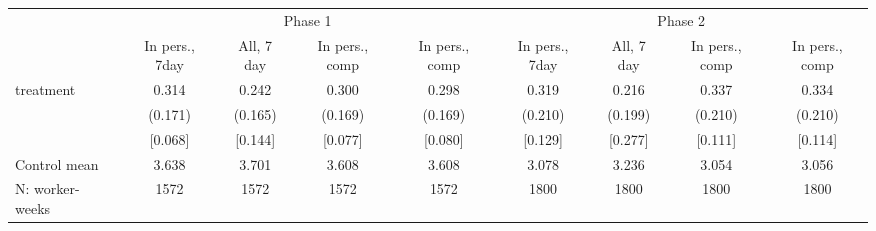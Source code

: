 \begin{tabular}{l*{8}{c}}
\toprule
            &\multicolumn{4}{c}{Phase 1}                        &\multicolumn{4}{c}{Phase 2}                        \\\cmidrule(lr){2-5}\cmidrule(lr){6-9}
            &\multicolumn{1}{c}{In pers., 7day}&\multicolumn{1}{c}{All, 7 day}&\multicolumn{1}{c}{In pers., comp}&\multicolumn{1}{c}{In pers., comp}&\multicolumn{1}{c}{In pers., 7day}&\multicolumn{1}{c}{All, 7 day}&\multicolumn{1}{c}{In pers., comp}&\multicolumn{1}{c}{In pers., comp}\\
\midrule
treatment   &       0.314&       0.242&       0.300&       0.298&       0.319&       0.216&       0.337&       0.334\\
            &     (0.171)&     (0.165)&     (0.169)&     (0.169)&     (0.210)&     (0.199)&     (0.210)&     (0.210)\\
            &     [0.068]&     [0.144]&     [0.077]&     [0.080]&     [0.129]&     [0.277]&     [0.111]&     [0.114]\\
\midrule
Control mean&       3.638&       3.701&       3.608&       3.608&       3.078&       3.236&       3.054&       3.056\\
N: worker-weeks&        1572&        1572&        1572&        1572&        1800&        1800&        1800&        1800\\
\bottomrule
\end{tabular}
